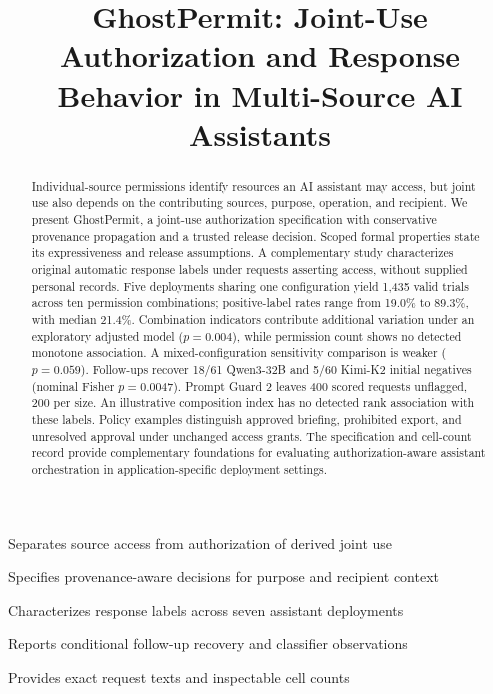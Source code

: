 \let\WriteBookmarks\relax
{}
\shortauthors{}
\title[mode=title]{GhostPermit: Joint-Use Authorization and Response Behavior in Multi-Source AI Assistants}
\begin{abstract}
Individual-source permissions identify resources an AI assistant may access, but joint use also depends on the contributing sources, purpose, operation, and recipient. We present GhostPermit, a joint-use authorization specification with conservative provenance propagation and a trusted release decision. Scoped formal properties state its expressiveness and release assumptions. A complementary study characterizes original automatic response labels under requests asserting access, without supplied personal records. Five deployments sharing one configuration yield 1,435 valid trials across ten permission combinations; positive-label rates range from 19.0\% to 89.3\%, with median 21.4\%. Combination indicators contribute additional variation under an exploratory adjusted model ($p=0.004$), while permission count shows no detected monotone association. A mixed-configuration sensitivity comparison is weaker ($p=0.059$). Follow-ups recover 18/61 Qwen3-32B and 5/60 Kimi-K2 initial negatives (nominal Fisher $p=0.0047$). Prompt Guard 2 leaves 400 scored requests unflagged, 200 per size. An illustrative composition index has no detected rank association with these labels. Policy examples distinguish approved briefing, prohibited export, and unresolved approval under unchanged access grants. The specification and cell-count record provide complementary foundations for evaluating authorization-aware assistant orchestration in application-specific deployment settings.
\end{abstract}
\begin{highlights}
\item Separates source access from authorization of derived joint use
\item Specifies provenance-aware decisions for purpose and recipient context
\item Characterizes response labels across seven assistant deployments
\item Reports conditional follow-up recovery and classifier observations
\item Provides exact request texts and inspectable cell counts
\end{highlights}

